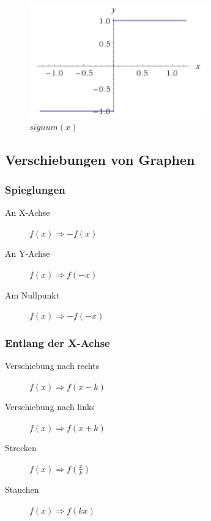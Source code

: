 \begin{figure}[ht!]
	\centering
	\begin{minipage}[t]{0.4\textwidth}
		\centering
		\includegraphics[width=\textwidth]{images/graph_signum}
		\caption{$signum(x)$}
	\end{minipage}
\end{figure}

\clearpage

\subsection{Verschiebungen von Graphen}
\subsubsection{Spieglungen}
\begin{description}
	\item[An X-Achse] $f(x) \Rightarrow -f(x)$
	\item[An Y-Achse] $f(x) \Rightarrow f(-x)$
	\item[Am Nullpunkt] $f(x) \Rightarrow -f(-x)$
\end{description}

\subsubsection{Entlang der X-Achse}
\begin{description}
	\item[Verschiebung nach rechts] $f(x) \Rightarrow f(x - k)$
	\item[Verschiebung nach links] $f(x) \Rightarrow f(x + k)$
	\item[Strecken] $f(x) \Rightarrow f(\frac{x}{k})$
	\item[Stauchen] $f(x) \Rightarrow f(kx)$
\end{description}


